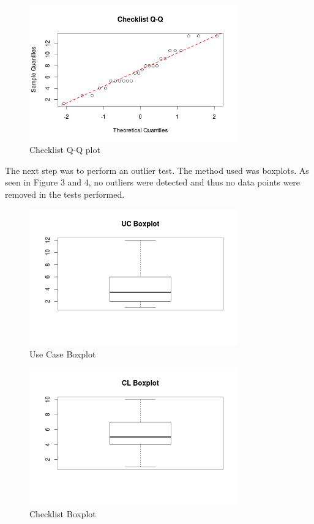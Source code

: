 \documentclass[10pt,twocolumn]{article}
\begin{document}
\begin{figure}[ht]
\centering
\includegraphics[width=90mm]{cl_qq.png}
\caption{Checklist Q-Q plot}
\end{figure}


The next step was to perform an outlier test. The method used was boxplots. As seen in Figure 3 and 4, no outliers were detected and thus no data points were removed in the tests performed. 

\begin{figure}[ht]
\centering
\includegraphics[width=90mm]{uc_box.png}
\caption{Use Case Boxplot}
\end{figure}

\begin{figure}[ht]
\centering
\includegraphics[width=90mm]{cl_box.png}
\caption{Checklist Boxplot}
\end{figure}
\end{document}
